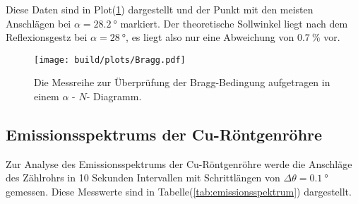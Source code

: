           \noindent Diese Daten sind in Plot(\ref{fig:bragg}) dargestellt und der Punkt mit den meisten Anschlägen bei $\alpha = \SI{28.2}{\degree}$ markiert. 
          Der theoretische Sollwinkel liegt nach dem Reflexionsgestz bei $\alpha = \SI{28}{\degree}$, es liegt also nur eine Abweichung von 
          $\SI{0.7}{\percent}$ vor.

          \begin{figure}
            \centering
            \texttt{[image: build/plots/Bragg.pdf]}
            \caption{Die Messreihe zur Überprüfung der Bragg-Bedingung aufgetragen in einem $\alpha$ - $N$- Diagramm.}
            \label{fig:bragg}
          \end{figure}

    \subsection{Emissionsspektrums der Cu-Röntgenröhre}\label{sec:Cu-Röntgenröhre}

         
        \noindent Zur Analyse des Emissionsspektrums der Cu-Röntgenröhre werde die Anschläge des Zählrohrs in 10 Sekunden Intervallen mit 
        Schrittlängen von $\Delta \theta = \SI{0.1}{\degree}$ gemessen. Diese Messwerte sind in Tabelle(\ref{tab:emissionsspektrum}) dargestellt.
        
